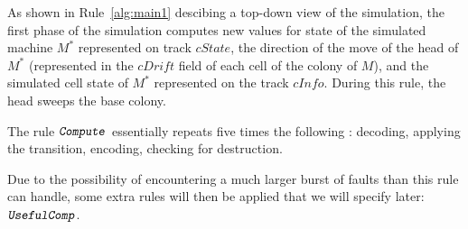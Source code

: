 \documentclass[12pt]{memoir}
\newcommand{\fld}[1]{\ensuremath{\textit{#1}}}
\newcommand{\rul}[1]{\ensuremath{\texttt{\slshape #1\/}}}
\newcommand{\cDrift}{\fld{cDrift}}
\newcommand{\cInfo}{\fld{cInfo}}
\newcommand{\cState}{\fld{cState}}
\newcommand{\Comp}{\rul{Compute}}
\newcommand{\UsefulComp}{\rul{UsefulComp}}
\begin{document}
As shown in Rule~\ref{alg:main1} descibing a top-down view of the simulation,
the first phase of the simulation computes new values for state of the 
simulated machine \( M^{*} \)
represented on track \( \cState \), the direction of the move of the head of  \( M^{*} \)
(represented in the \( \cDrift \) field of each cell of the colony of \( M \)), and
the simulated cell state of \( M^{*} \) represented on the track \( \cInfo \).
During this rule, the head sweeps the base colony.

The rule \( \Comp \) essentially repeats five times the following :
decoding, applying the transition, encoding, checking for destruction.

Due to the possibility of encountering a much larger burst of faults than
this rule can handle, some extra rules will then be applied that we will specify later:
\( \UsefulComp \).  %
\end{document}
